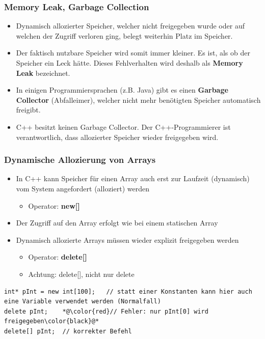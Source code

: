 \subsubsection{Memory Leak, Garbage Collection}
\label{sec:Memory Leak, Garbage Collection}
\begin{itemize}
	\item Dynamisch allozierter Speicher, welcher nicht freigegeben wurde oder auf welchen der Zugriff verloren ging, belegt weiterhin Platz im Speicher.
	\item Der faktisch nutzbare Speicher wird somit immer kleiner. Es ist, als ob der Speicher ein Leck hätte. Dieses Fehlverhalten wird deshalb als \textbf{Memory Leak} bezeichnet.
	\item In einigen Programmiersprachen (z.B. Java) gibt es einen \textbf{Garbage Collector} (Abfalleimer), welcher nicht mehr benötigten Speicher automatisch freigibt.
	\item C++ besitzt keinen Garbage Collector. Der C++-Programmierer ist verantwortlich, dass allozierter Speicher wieder freigegeben wird.
\end{itemize}

\subsubsection{Dynamische Allozierung von Arrays}
\label{sec:Dynamische Allozierung von Arrays}
\begin{itemize}
	\item In C++ kann Speicher für einen Array auch erst zur Laufzeit (dynamisch) vom System angefordert (alloziert) werden
	\begin{itemize}
		\item Operator: \textbf{new[]}
	\end{itemize}
	\item Der Zugriff auf den Array erfolgt wie bei einem statischen Array
	\item Dynamisch allozierte Arrays müssen wieder explizit freigegeben werden
	\begin{itemize}
		\item Operator: \textbf{delete[]}
		\item \color{red}Achtung: delete[], nicht nur delete\color{black}
	\end{itemize}
\end{itemize}
\noindent
\begin{minipage}{\linewidth}
\begin{lstlisting}
int* pInt = new int[100];	// statt einer Konstanten kann hier auch eine Variable verwendet werden (Normalfall)
delete pInt;	*@\color{red}// Fehler: nur pInt[0] wird freigegeben\color{black}@*
delete[] pInt;	// korrekter Befehl
\end{lstlisting}
\end{minipage} 

